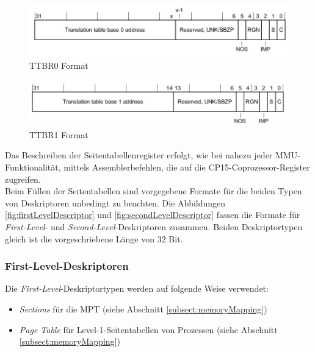 \begin{figure}[H]
	\includegraphics[scale=0.8]{chapters/mmu/figures/ttbr0format}
	\caption{TTBR0 Format \cite[S. B4-1726]{ARM:ARM}}
	\label{fig:TTBR0Format}
\end{figure}


\begin{figure}[H]
	\includegraphics[scale=0.8]{chapters/mmu/figures/ttbr1format}
	\caption{TTBR1 Format \cite[S. B4-1730]{ARM:ARM}}
	\label{fig:TTBR1Format}
\end{figure}

Das Beschreiben der Seitentabellenregister erfolgt, wie bei nahezu jeder \ac{MMU}-Funktionalität, mittels Assemblerbefehlen, die auf die CP15-Coprozessor-Register zugreifen.\\

Beim Füllen der Seitentabellen sind vorgegebene Formate für die beiden Typen von Deskriptoren unbedingt zu beachten. Die Abbildungen \ref{fig:firstLevelDescriptor} und \ref{fig:secondLevelDescriptor} fassen die Formate für \textit{First-Level}- und \textit{Second-Level}-Deskriptoren zusammen. Beiden Deskriptortypen gleich ist die vorgeschriebene Länge von $32$ Bit.\\

\subsubsection*{First-Level-Deskriptoren}

Die \textit{First-Level}-Deskriptortypen werden auf folgende Weise verwendet:

\begin{itemize}
	\item \textit{Sections} für die \ac{MPT} (siehe Abschnitt \ref{subsect:memoryMapping}) 
	\item \textit{Page Table} für Level-1-Seitentabellen von Prozessen (siehe Abschnitt \ref{subsect:memoryMapping})
\end{itemize}

